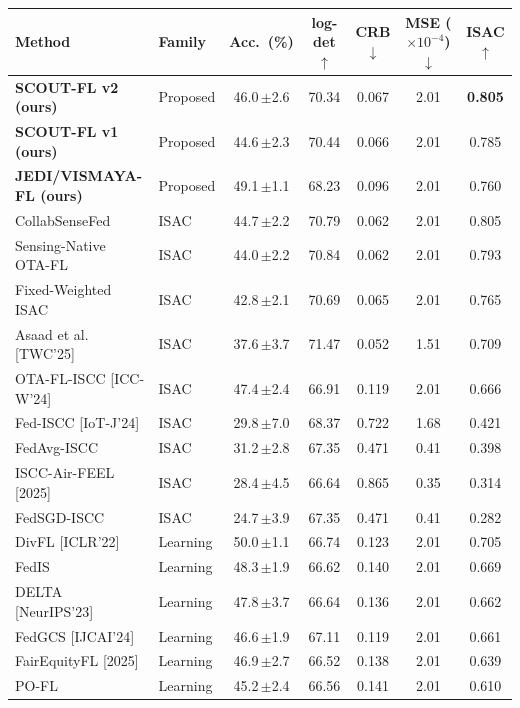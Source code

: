 \begin{tabular}{@{}l l c c c c c@{}}
\toprule
Method & Family & Acc.\ (\%) & log-det $\uparrow$ & CRB $\downarrow$ & MSE ($\times10^{-4}$) $\downarrow$ & ISAC $\uparrow$ \\
\midrule
\textbf{SCOUT-FL v2 (ours)} & Proposed & 46.0\,\footnotesize$\pm$2.6 & 70.34 & 0.067 & 2.01 & \textbf{0.805} \\
\textbf{SCOUT-FL v1 (ours)} & Proposed & 44.6\,\footnotesize$\pm$2.3 & 70.44 & 0.066 & 2.01 & 0.785 \\
\textbf{JEDI/VISMAYA-FL (ours)} & Proposed & 49.1\,\footnotesize$\pm$1.1 & 68.23 & 0.096 & 2.01 & 0.760 \\
\midrule
CollabSenseFed & ISAC & 44.7\,\footnotesize$\pm$2.2 & 70.79 & 0.062 & 2.01 & 0.805 \\
Sensing-Native OTA-FL & ISAC & 44.0\,\footnotesize$\pm$2.2 & 70.84 & 0.062 & 2.01 & 0.793 \\
Fixed-Weighted ISAC & ISAC & 42.8\,\footnotesize$\pm$2.1 & 70.69 & 0.065 & 2.01 & 0.765 \\
Asaad et al. [TWC'25] & ISAC & 37.6\,\footnotesize$\pm$3.7 & 71.47 & 0.052 & 1.51 & 0.709 \\
OTA-FL-ISCC [ICC-W'24] & ISAC & 47.4\,\footnotesize$\pm$2.4 & 66.91 & 0.119 & 2.01 & 0.666 \\
Fed-ISCC [IoT-J'24] & ISAC & 29.8\,\footnotesize$\pm$7.0 & 68.37 & 0.722 & 1.68 & 0.421 \\
FedAvg-ISCC & ISAC & 31.2\,\footnotesize$\pm$2.8 & 67.35 & 0.471 & 0.41 & 0.398 \\
ISCC-Air-FEEL [2025] & ISAC & 28.4\,\footnotesize$\pm$4.5 & 66.64 & 0.865 & 0.35 & 0.314 \\
FedSGD-ISCC & ISAC & 24.7\,\footnotesize$\pm$3.9 & 67.35 & 0.471 & 0.41 & 0.282 \\
\midrule
DivFL [ICLR'22] & Learning & 50.0\,\footnotesize$\pm$1.1 & 66.74 & 0.123 & 2.01 & 0.705 \\
FedIS & Learning & 48.3\,\footnotesize$\pm$1.9 & 66.62 & 0.140 & 2.01 & 0.669 \\
DELTA [NeurIPS'23] & Learning & 47.8\,\footnotesize$\pm$3.7 & 66.64 & 0.136 & 2.01 & 0.662 \\
FedGCS [IJCAI'24] & Learning & 46.6\,\footnotesize$\pm$1.9 & 67.11 & 0.119 & 2.01 & 0.661 \\
FairEquityFL [2025] & Learning & 46.9\,\footnotesize$\pm$2.7 & 66.52 & 0.138 & 2.01 & 0.639 \\
PO-FL & Learning & 45.2\,\footnotesize$\pm$2.4 & 66.56 & 0.141 & 2.01 & 0.610 \\

\end{tabular}
